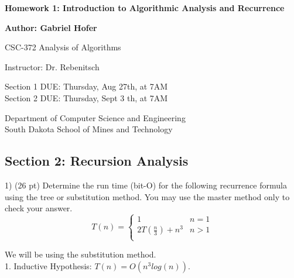 \documentclass[8pt, a4paper]{article}
\begin{document}
\begin{titlepage}
   \begin{center}
       \vspace*{1cm}
       \large
       \textbf{Homework 1: Introduction to Algorithmic Analysis and Recurrence}
       \normalsize

       \vspace{0.5cm}

       \textbf{Author: Gabriel Hofer}

       \vspace{0.5cm}

       CSC-372 Analysis of Algorithms

       \vspace{0.5cm}

       Instructor: Dr. Rebenitsch

       \vspace{0.5cm}

       Section 1 DUE: Thursday, Aug 27th, at 7AM \\ 
       Section 2 DUE: Thursday, Sept 3 th, at 7AM  

       \vfill

       Department of Computer Science and Engineering\\
       South Dakota School of Mines and Technology\\

   \end{center}
\end{titlepage}
\newpage
\subsection*{Section 2: Recursion Analysis}

1) (26 pt) Determine the run time (bit-O) for the following recurrence formula using the tree or substitution method.
You may use the master method only to check your answer. \\ 

\[
  T(n) =  
  \begin{cases}
    1 & n = 1  \\
    2T(\frac{n}{3}) + n^3 & n > 1  \\
  \end{cases}
\]

We will be using the substitution method. \\ 

1. Inductive Hypothesis: $ T(n) = O(n^3 log(n)) $.
\end{document}
